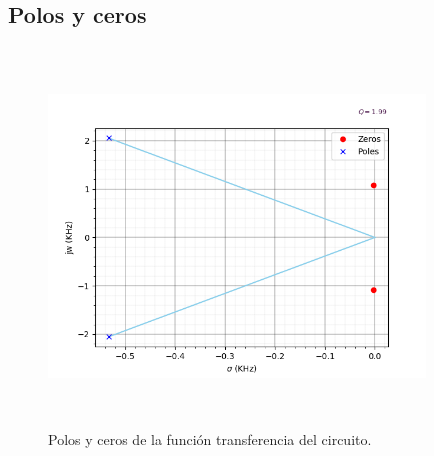 \subsection{Polos y ceros}


\begin{figure}[H] %
	\centering
	\includegraphics[width=10cm,height=10cm,keepaspectratio]{../EJ1/00GRAFICOS/singularidades.png}
	\caption{Polos y ceros de la funci\'on transferencia del circuito.}
	\label{c1vinmax}
\end{figure}
